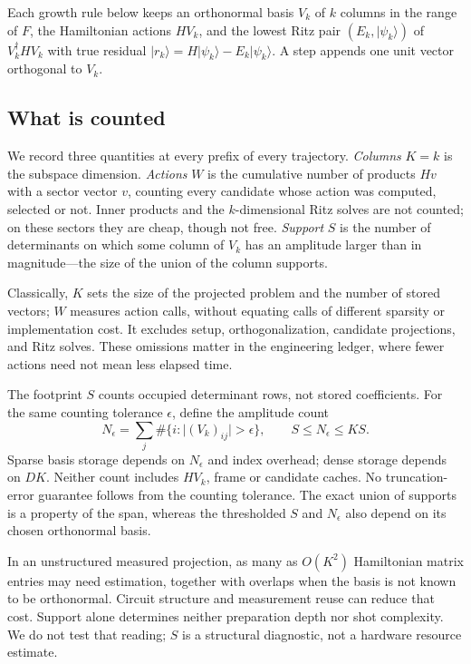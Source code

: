 \documentclass[aps,pra,reprint,superscriptaddress,nofootinbib,floatfix,
  showkeys,raggedbottom]{revtex4-2}
\newcommand{\ket}[1]{\lvert #1\rangle}
\begin{document}
Each growth rule below keeps an orthonormal basis $V_k$ of $k$ columns in the
range of $F$, the Hamiltonian actions $HV_k$, and the lowest Ritz pair
$(E_k,\ket{\psi_k})$ of $V_k^\dagger H V_k$ with true residual
$\ket{r_k}=H\ket{\psi_k}-E_k\ket{\psi_k}$. A step appends one unit vector
orthogonal to $V_k$.

\subsection{What is counted}

We record three quantities at every prefix of every trajectory.
\emph{Columns} $K=k$ is the subspace dimension.
\emph{Actions} $W$ is the cumulative number of products $Hv$ with a sector
vector $v$, counting every candidate whose action was computed, selected or
not. Inner products and the $k$-dimensional Ritz solves are not counted; on
these sectors they are cheap, though not free.
\emph{Support} $S$ is the number of determinants on which some column of $V_k$
has an amplitude larger than \pkSupportTolerance{} in magnitude---the size of
the union of the column supports.

Classically, $K$ sets the size of the projected problem and the number of
stored vectors; $W$ measures action calls, without equating calls of different
sparsity or implementation cost. It excludes setup, orthogonalization,
candidate projections, and Ritz solves. These omissions matter in the
engineering ledger, where fewer actions need not mean less elapsed time.

The footprint $S$ counts occupied determinant rows, not stored coefficients.
For the same counting tolerance $\epsilon$, define the amplitude count
\begin{equation}
N_\epsilon=\sum_j\#\{i:\lvert(V_k)_{ij}\rvert>\epsilon\},
\qquad S\le N_\epsilon\le KS.
\label{eq:amplitude-count}
\end{equation}
Sparse basis storage depends on $N_\epsilon$ and index overhead; dense storage
depends on $DK$. Neither count includes $HV_k$, frame or candidate caches.
No truncation-error guarantee follows from the counting tolerance. The exact
union of supports is a property of the span, whereas the thresholded $S$ and
$N_\epsilon$ also depend on its chosen orthonormal basis.

In an unstructured measured projection, as many as $O(K^2)$ Hamiltonian
matrix entries may need estimation, together with overlaps when the basis is
not known to be orthonormal. Circuit structure and measurement reuse can
reduce that cost. Support alone determines neither preparation depth nor shot
complexity. We do not test that reading; $S$ is a structural diagnostic, not
a hardware resource estimate.
\end{document}
